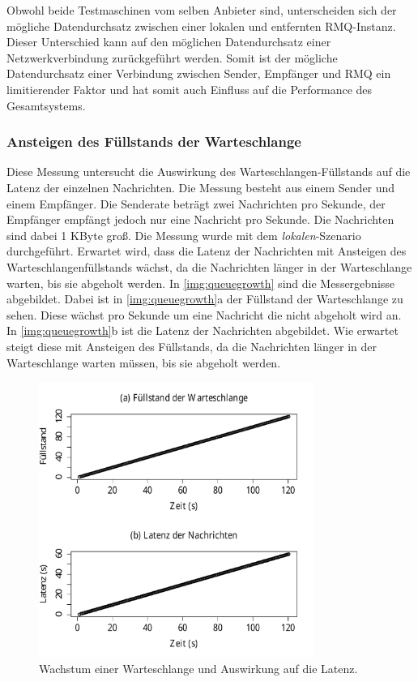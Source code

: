Obwohl beide Testmaschinen vom selben Anbieter sind, unterscheiden sich der mögliche Datendurchsatz zwischen einer lokalen und entfernten RMQ-Instanz. Dieser Unterschied kann auf den möglichen Datendurchsatz einer Netzwerkverbindung zurückgeführt werden. Somit ist der mögliche Datendurchsatz einer Verbindung zwischen Sender, Empfänger und RMQ ein limitierender Faktor und hat somit auch Einfluss auf die Performance des Gesamtsystems.

\subsubsection{Ansteigen des Füllstands der Warteschlange}
\label{sec:queueGrowth}
Diese Messung untersucht die Auswirkung des Warteschlangen-Füllstands auf die Latenz der einzelnen Nachrichten. Die Messung besteht aus einem Sender und einem Empfänger. Die Senderate beträgt zwei Nachrichten pro Sekunde, der Empfänger empfängt jedoch nur eine Nachricht pro Sekunde. Die Nachrichten sind dabei 1 KByte groß. Die Messung wurde mit dem \textit{lokalen}-Szenario durchgeführt. Erwartet wird, dass die Latenz der Nachrichten mit Ansteigen des Warteschlangenfüllstands wächst, da die Nachrichten länger in der Warteschlange warten, bis sie abgeholt werden.
In \autoref{img:queuegrowth} sind die Messergebnisse abgebildet. Dabei ist in \autoref{img:queuegrowth}a der Füllstand der Warteschlange zu sehen. Diese wächst pro Sekunde um eine Nachricht die nicht abgeholt wird an. In \autoref{img:queuegrowth}b ist die Latenz der Nachrichten abgebildet. Wie erwartet steigt diese mit Ansteigen des Füllstands, da die Nachrichten länger in der Warteschlange warten müssen, bis sie abgeholt werden.
\begin{figure}
\center
  \includegraphics[width=0.8\textwidth]{images/measurement/queuegrowth.pdf}
  \caption{Wachstum einer Warteschlange und Auswirkung auf die Latenz.}
  \label{img:queuegrowth}
\end{figure}

